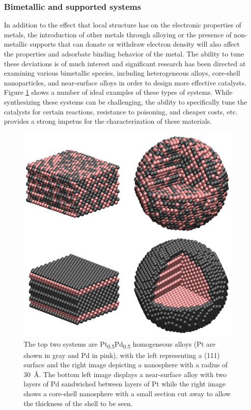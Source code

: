 \subsubsection{Bimetallic and supported systems}
In addition to the effect that local structure has on the electronic properties
of metals, the introduction of other metals through alloying or the presence of
non-metallic  supports that can donate or withdraw electron density will also
affect the properties and adsorbate binding behavior of the metal. The ability
to tune these deviations is of much interest and significant research has been
directed at examining various bimetallic species, including heterogeneous
alloys,\citep{Stamenkovic:2007kk, Yu:2013fr} core-shell
nanoparticles,\citep{Huang:2012ul, Tao:2008aa, Wang:2015qb} and near-surface
alloys\citep{Stephens:2011bv, Jan-Knudsen:2007fe} in order to design more effective
catalysts.  Figure \ref{fig:bimetallic} shows a number of ideal examples of
these types of systems. While synthesizing these systems can be challenging,
the ability to specifically tune the catalysts for certain reactions,
resistance to poisoning\citep{Yu:2013fr, Sharma:0ly}, and cheaper
costs\citep{Li:0hl, Zhao:0qf}, etc. provides a strong impetus for the
characterization of these materials.

\begin{figure}[p!]
  \includegraphics[width=\linewidth]{../figures/chap1/bimetallic.pdf}
\caption{The top two systems are Pt\textsubscript{0.5}Pd\textsubscript{0.5}
homogeneous alloys (Pt are shown in gray and Pd in pink), with the left
representing a (111) surface and the right image depicting a nanosphere with a
radius of 30~\AA. The bottom left image displays a near-surface alloy with two
layers of Pd sandwiched between layers of Pt while the right image shows a
core-shell nanosphere with a small section cut away to allow the thickness of
the shell to be seen.}
\label{fig:bimetallic} 
\end{figure}

